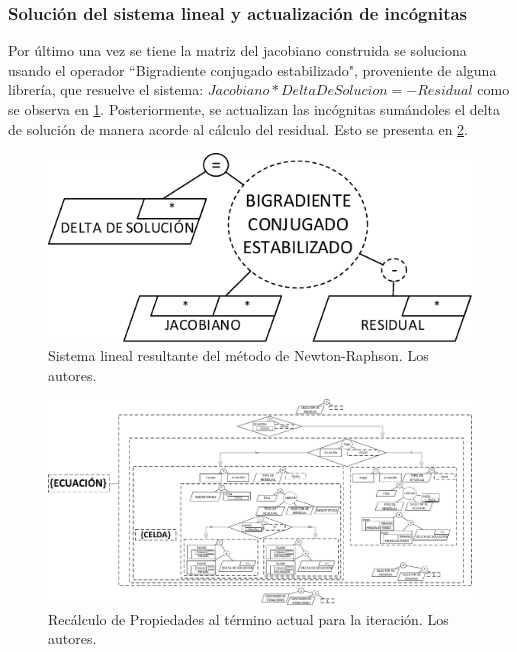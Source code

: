 \subsubsection{Solución del sistema lineal y actualización de incógnitas}
Por último una vez se tiene la matriz del jacobiano construida se soluciona usando el operador ``Bigradiente conjugado estabilizado", proveniente de alguna librería, que resuelve el sistema: $Jacobiano*DeltaDeSolucion = -Residual$ como se observa en \ref{fig:LinearSystem}. Posteriormente, se actualizan las incógnitas sumándoles el delta de solución de manera acorde al cálculo del residual. Esto se presenta en \ref{fig:UpdateVariables}. \\

\begin{figure}[h]
	\centering%
	\includegraphics[scale=1]{Fig/SistemaLineal.pdf}%
	\caption[Sistema lineal resultante del método de Newton-Raphson.]{Sistema lineal resultante del método de Newton-Raphson. Los autores.} \label{fig:LinearSystem}
\end{figure}

\begin{figure}[h]
	\centering%
	\includegraphics[width=\linewidth]{Fig/ActualizacionDeIncognitas.pdf}%
	\caption[Recálculo de Propiedades al término actual para la iteración.]{Recálculo de Propiedades al término actual para la iteración. Los autores.} \label{fig:UpdateVariables}
\end{figure}


